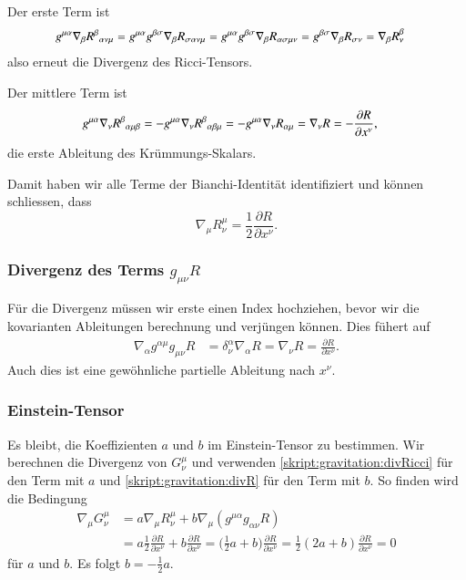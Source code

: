 Der erste Term ist 
\begin{align*}
g^{\mu\alpha}
\nabla_\beta R^\beta\mathstrut_{\alpha\nu\mu}
&=
g^{\mu\alpha}
g^{\beta\sigma}
\nabla_\beta R_{\sigma\alpha\nu\mu}
=
g^{\mu\alpha}
g^{\beta\sigma}
\nabla_\beta R_{\alpha\sigma\mu\nu}
=
g^{\beta\sigma}
\nabla_\beta R_{\sigma\nu}
=
\nabla_\beta R^\beta_\nu
\end{align*}
also erneut die Divergenz des Ricci-Tensors.

Der mittlere Term ist 
\begin{align*}
g^{\mu\alpha}
\nabla_\nu R^\beta\mathstrut_{\alpha\mu\beta}
&=
-
g^{\mu\alpha}
\nabla_\nu R^\beta\mathstrut_{\alpha\beta\mu}
=
-g^{\mu\alpha}
\nabla_\nu R_{\alpha\mu}
=
\nabla_\nu R
=
-\frac{\partial R}{\partial x^\nu},
\end{align*}
die erste Ableitung des Krümmungs-Skalars.

Damit haben wir alle Terme der Bianchi-Identität identifiziert und können
schliessen, dass
\begin{equation}
\nabla_\mu R^\mu_\nu
=
\frac12\frac{\partial R}{\partial x^\nu}.
\label{skript:gravitation:divRicci}
\end{equation}

\subsubsection{Divergenz des Terms $g_{\mu\nu}R$}
Für die Divergenz müssen wir erste einen Index hochziehen, bevor
wir die kovarianten Ableitungen berechnung und verjüngen können.
Dies fühert auf
\begin{align}
\nabla_\alpha g^{\alpha\mu}g_{\mu\nu}R
&=
\delta^\alpha_\nu \nabla_\alpha R
=
\nabla_\nu R
=
\frac{\partial R}{\partial x^\nu}.
\label{skript:gravitation:divR}
\end{align}
Auch dies ist eine gewöhnliche partielle Ableitung nach $x^\nu$.

\subsubsection{Einstein-Tensor}
Es bleibt, die Koeffizienten $a$ und $b$ im Einstein-Tensor zu
bestimmen.
Wir berechnen die Divergenz von $G^\mu_\nu$ und verwenden
\eqref{skript:gravitation:divRicci} für den Term mit $a$ und
\eqref{skript:gravitation:divR} für den Term mit $b$.
So finden wird die Bedingung
\begin{align*}
\nabla_\mu G^\mu_\nu
&=
a \nabla_\mu R^\mu_\nu + b \nabla_\mu (g^{\mu\alpha}g_{\alpha\nu} R)
\\
&=
a \frac12\frac{\partial R}{\partial x^\nu}
+
b \frac{\partial R}{\partial x^\nu}
=
\biggl(\frac12a+b\biggr)
\frac{\partial R}{\partial x^\nu}
=
\frac12(2a+b)
\frac{\partial R}{\partial x^\nu}
=
0
\end{align*}
für $a$ und $b$.
Es folgt $b = -\frac12a$.

